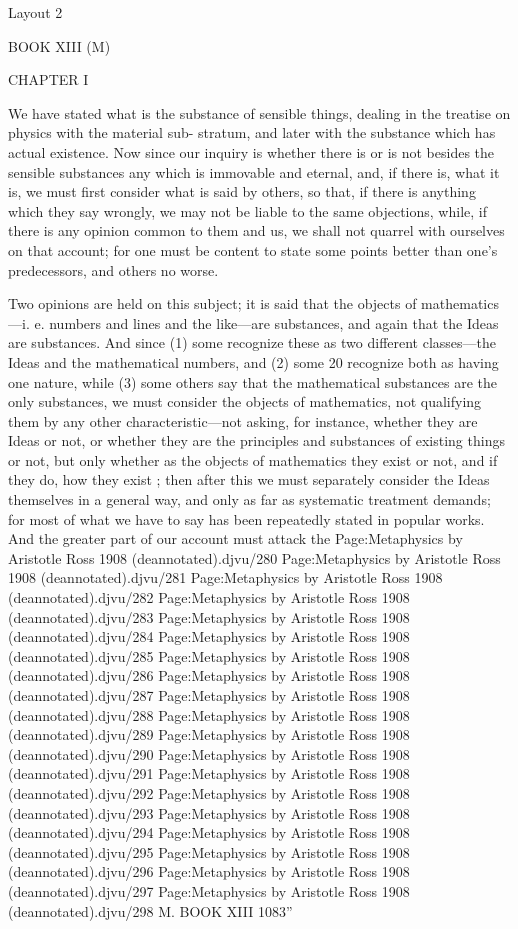 
Layout 2

BOOK XIII (M)

CHAPTER I

We have stated what is the substance of sensible things,
dealing in the treatise on physics with the material sub-
stratum, and later with the substance which has actual
existence. Now since our inquiry is whether there is or is
not besides the sensible substances any which is immovable
and eternal, and, if there is, what it is, we must first consider
what is said by others, so that, if there is anything which they
say wrongly, we may not be liable to the same objections,
while, if there is any opinion common to them and us, we
shall not quarrel with ourselves on that account; for one
must be content to state some points better than one's
predecessors, and others no worse.

Two opinions are held on this subject; it is said that the
objects of mathematics—i. e. numbers and lines and the like—are substances, and again that the Ideas are substances.
And since (1) some recognize these as two different classes—the Ideas and the mathematical numbers, and (2) some 20
recognize both as having one nature, while (3) some others
say that the mathematical substances are the only substances,
we must consider the objects of mathematics, not qualifying
them by any other characteristic—not asking, for instance,
whether they are Ideas or not, or whether they are the
principles and substances of existing things or not, but only
whether as the objects of mathematics they exist or not, and
if they do, how they exist ; then after this we must separately consider the Ideas themselves in a general way, and
only as far as systematic treatment demands; for most of
what we have to say has been repeatedly stated in popular
works. And the greater part of our account must attack the Page:Metaphysics by Aristotle Ross 1908 (deannotated).djvu/280 Page:Metaphysics by Aristotle Ross 1908 (deannotated).djvu/281 Page:Metaphysics by Aristotle Ross 1908 (deannotated).djvu/282 Page:Metaphysics by Aristotle Ross 1908 (deannotated).djvu/283 Page:Metaphysics by Aristotle Ross 1908 (deannotated).djvu/284 Page:Metaphysics by Aristotle Ross 1908 (deannotated).djvu/285 Page:Metaphysics by Aristotle Ross 1908 (deannotated).djvu/286 Page:Metaphysics by Aristotle Ross 1908 (deannotated).djvu/287 Page:Metaphysics by Aristotle Ross 1908 (deannotated).djvu/288 Page:Metaphysics by Aristotle Ross 1908 (deannotated).djvu/289 Page:Metaphysics by Aristotle Ross 1908 (deannotated).djvu/290 Page:Metaphysics by Aristotle Ross 1908 (deannotated).djvu/291 Page:Metaphysics by Aristotle Ross 1908 (deannotated).djvu/292 Page:Metaphysics by Aristotle Ross 1908 (deannotated).djvu/293 Page:Metaphysics by Aristotle Ross 1908 (deannotated).djvu/294 Page:Metaphysics by Aristotle Ross 1908 (deannotated).djvu/295 Page:Metaphysics by Aristotle Ross 1908 (deannotated).djvu/296 Page:Metaphysics by Aristotle Ross 1908 (deannotated).djvu/297 Page:Metaphysics by Aristotle Ross 1908 (deannotated).djvu/298 M. BOOK XIII 1083”

